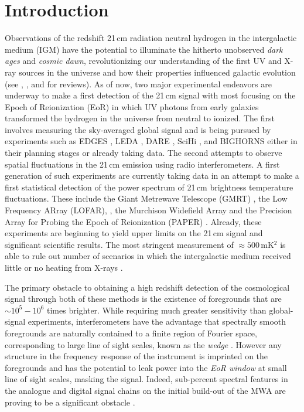 \documentclass[twocolumn]{emulateapj}
\begin{document}
\section{Introduction}
Observations of the redshift 21\,cm radiation neutral hydrogen in the intergalactic medium (IGM) have the potential to illuminate the hitherto unobserved {\it dark ages} and {\it cosmic dawn}, revolutionizing our understanding of the first UV and X-ray sources in the universe and how their properties influenced galactic evolution (see \citet{Furlanetto:2006Review}, \citet{Morales:2010}, and \citet{Pritchard:2012} for reviews). As of now, two major experimental endeavors are underway to make a first detection of the 21\,cm signal with most focusing on the Epoch of Reionization (EoR) in which UV photons from early galaxies transformed the hydrogen in the universe from neutral to ionized. The first involves measuring the sky-averaged global signal and is being pursued by experiments such as EDGES \citep{Bowman:2010}, LEDA \citep{Greenhill:2012,Bernardi:2015}, DARE \citep{Burns:2012}, SciHi \citep{Voytek:2014}, and BIGHORNS \citep{Sokolowski:2015} either in their planning stages or already taking data. The second attempts to observe spatial  fluctuations in the 21\,cm emission using radio interferometers. A first generation of such experiments are currently taking data in an attempt to make a first statistical detection of the power spectrum of 21\,cm brightness temperature fluctuations. These include the Giant Metrewave Telescope (GMRT)  \citep{Paciga:2013}, the Low Frequency ARray (LOFAR), \citep{VanHaarlem:2013}, the Murchison Widefield Array \citep{Tingay:2013a} and the Precision Array for Probing the Epoch of Reionization (PAPER) \citep{Parsons:2010}. Already, these experiments are beginning to yield upper limits on the 21\,cm signal \citep{Dillon:2013,Parsons:2014,Jacobs:2015,Dillon:2015,EwallWice:2015a} and significant scientific results. The most stringent measurement of $\approx 500$\,mK$^2$ \citep{Ali:2015} is able to rule out number of scenarios in which the intergalactic medium received little or no heating from X-rays \citep{Pober:2015,Greig:2015b}. 

The primary obstacle to obtaining a high redshift detection of the cosmological signal through both of these methods is the existence of foregrounds that are $\sim 10^5-10^6$ times brighter. While requiring much greater sensitivity than global-signal experiments, interferometers have the advantage that spectrally smooth foregrounds are naturally contained to a finite region of Fourier space, corresponding to large line of sight scales, known as the {\it wedge} \citep{Datta:2010,Vedantham:2012,Parsons:2012,Thyagarajan:2013,Liu:2014a,Liu:2014}. However any structure in the frequency response of the instrument is imprinted on the foregrounds and has the potential to leak power into the {\it EoR window} at small line of sight scales, masking the signal. Indeed, sub-percent spectral features in the analogue and digital signal chains on the initial build-out of the MWA are proving to be a significant obstacle \citep{Dillon:2015b,EwallWice:2015a,Beardsley:2015b}. 
\end{document}

